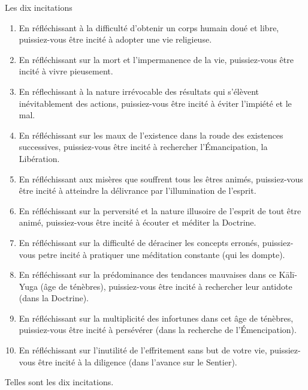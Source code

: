 \documentclass[10pt]{book}
\makeatletter
\renewcommand{\section}{\@startsection{section}{0}{0mm}
   {\baselineskip}
   {\baselineskip}{\normalfont\normalsize\scshape\centering}
}
\makeatother
\begin{document}
\section{Les dix incitations}
\begin{enumerate}[1.-]
\item En réfléchissant à la difficulté d'obtenir un corps humain doué et libre, puissiez-vous être incité à adopter une vie religieuse.
\item En réfléchissant sur la mort et l'impermanence de la vie, puissiez-vous être incité à vivre pieusement.
\item En réflechissant à la nature irrévocable des résultats qui s'élèvent inévitablement des actions, puissiez-vous être incité à éviter l'impiété et le mal.
\item En réfléchissant sur les maux de l'existence dans la roude des existences successives, puissiez-vous être incité à rechercher l'Émancipation, la Libération.
\item En réfléchissant aux misères que souffrent tous les êtres animés, puissiez-vous être incité à atteindre la délivrance par l'illumination de l'esprit.
\item En réfléchissant sur la perversité et la nature illusoire de l'esprit de tout être animé, puissiez-vous être incité à écouter et méditer la Doctrine.
\item En réfléchissant sur la difficulté de déraciner les concepts erronés, puissiez-vous petre incité à pratiquer une méditation constante (qui les dompte).
\item En réfléchissant sur la prédominance des tendances mauvaises dans ce Kālī-Yuga (âge de ténèbres), puissiez-vous être incité à rechercher leur antidote (dans la Doctrine).
\item En réfléchissant sur la multiplicité des infortunes dans cet âge de ténèbres, puissiez-vous être incité à persévérer (dans la recherche de l'Émencipation).
\item En réfléchissant sur l'inutilité de l'effritement sans but de votre vie, puissiez-vous être incité à la diligence (dans l'avance sur le Sentier).
\end{enumerate}
Telles sont les dix incitations.
\end{document}
